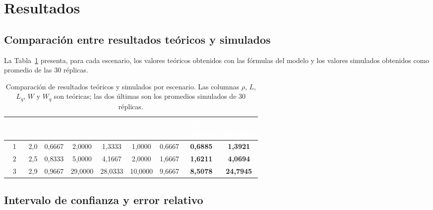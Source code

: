 \documentclass[11pt,a4paper]{article}
\renewcommand{\arraystretch}{1.08}
\begin{document}
\section{Resultados}

\subsection{Comparación entre resultados teóricos y simulados}

La Tabla~\ref{tab:comparacion} presenta, para cada escenario, los valores teóricos
obtenidos con las fórmulas del modelo y los valores simulados obtenidos como promedio
de las 30 réplicas.

\begin{table}[h!]
\centering
\setlength{\arrayrulewidth}{0.75pt}
\renewcommand{\arraystretch}{1.3}
\small
\begin{tabular}{|c|c|c|c|c|c|c|c|c|}
\hline
\rowcolor{headerblue}
\textbf{\textcolor{white}{Esc.}} &
\textbf{\textcolor{white}{$\lambda$}} &
\textbf{\textcolor{white}{$\rho$}} &
\textbf{\textcolor{white}{$L$}} &
\textbf{\textcolor{white}{$L_q$}} &
\textbf{\textcolor{white}{$W$}} &
\textbf{\textcolor{white}{$W_q$}} &
\makecell{\textbf{\textcolor{white}{Espera}} \\ \textbf{\textcolor{white}{simulada}}} &
\makecell{\textbf{\textcolor{white}{Cola}} \\ \textbf{\textcolor{white}{simulada}}} \\ \hline
1 & 2{,}0 & 0{,}6667 & 2{,}0000 & 1{,}3333 & 1{,}0000 & 0{,}6667 & \textbf{0{,}6885} & \textbf{1{,}3921} \\ \hline
\rowcolor{rowlight}
2 & 2{,}5 & 0{,}8333 & 5{,}0000 & 4{,}1667 & 2{,}0000 & 1{,}6667 & \textbf{1{,}6211} & \textbf{4{,}0694} \\ \hline
3 & 2{,}9 & 0{,}9667 & 29{,}0000 & 28{,}0333 & 10{,}0000 & 9{,}6667 & \textbf{8{,}5078} & \textbf{24{,}7945} \\ \hline
\end{tabular}
\caption{Comparación de resultados teóricos y simulados por escenario. Las columnas
$\rho$, $L$, $L_q$, $W$ y $W_q$ son teóricas; las dos últimas son los promedios
simulados de 30 réplicas.}
\label{tab:comparacion}
\end{table}

\subsection{Intervalo de confianza y error relativo}
\end{document}
